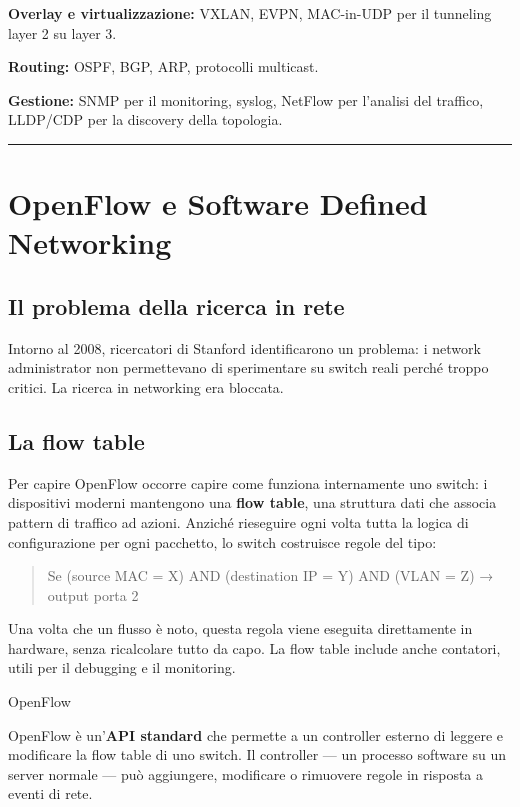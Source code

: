 \documentclass[
  italian,
  openany]{book}
\begin{document}
\textbf{Overlay e virtualizzazione:} VXLAN, EVPN, MAC-in-UDP per il
tunneling layer 2 su layer 3.

\textbf{Routing:} OSPF, BGP, ARP, protocolli multicast.

\textbf{Gestione:} SNMP per il monitoring, syslog, NetFlow per l'analisi
del traffico, LLDP/CDP per la discovery della topologia.

\begin{center}\rule{0.5\linewidth}{0.5pt}\end{center}

\section{OpenFlow e Software Defined
Networking}\label{openflow-e-software-defined-networking}

\subsection{Il problema della ricerca in
rete}\label{il-problema-della-ricerca-in-rete}

Intorno al 2008, ricercatori di Stanford identificarono un problema: i
network administrator non permettevano di sperimentare su switch reali
perché troppo critici. La ricerca in networking era bloccata.

\subsection{La flow table}\label{la-flow-table}

Per capire OpenFlow occorre capire come funziona internamente uno
switch: i dispositivi moderni mantengono una \textbf{flow table}, una
struttura dati che associa pattern di traffico ad azioni. Anziché
rieseguire ogni volta tutta la logica di configurazione per ogni
pacchetto, lo switch costruisce regole del tipo:

\begin{quote}
Se (source MAC = X) AND (destination IP = Y) AND (VLAN = Z) → output
porta 2
\end{quote}

Una volta che un flusso è noto, questa regola viene eseguita
direttamente in hardware, senza ricalcolare tutto da capo. La flow table
include anche contatori, utili per il debugging e il monitoring.

\begin{calloutdefinition}{OpenFlow}

OpenFlow è un'\textbf{API standard} che permette a un controller esterno
di leggere e modificare la flow table di uno switch. Il controller ---
un processo software su un server normale --- può aggiungere, modificare
o rimuovere regole in risposta a eventi di rete.

\end{calloutdefinition}
\end{document}
